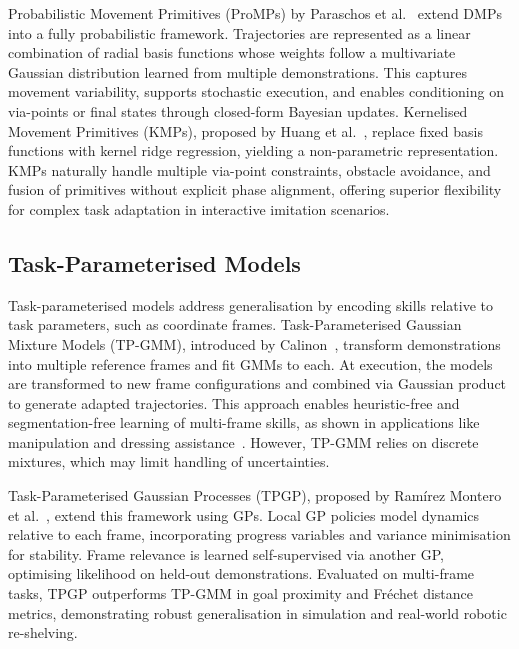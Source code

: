 \documentclass[a4paper, 10pt, conference]{ieeeconf}
\begin{document}
Probabilistic Movement Primitives (ProMPs) by Paraschos et al.~\cite{10.5555/2999792.2999904} extend DMPs into a fully probabilistic framework.
Trajectories are represented as a linear combination of radial basis functions whose weights follow a multivariate Gaussian distribution learned from multiple demonstrations.
This captures movement variability, supports stochastic execution, and enables conditioning on via-points or final states through closed-form Bayesian updates.
Kernelised Movement Primitives (KMPs), proposed by Huang et al.~\cite{Huang2019}, replace fixed basis functions with kernel ridge regression, yielding a non-parametric representation.
KMPs naturally handle multiple via-point constraints, obstacle avoidance, and fusion of primitives without explicit phase alignment, offering superior flexibility for complex task adaptation in interactive imitation scenarios.

\subsection{Task-Parameterised Models}

Task-parameterised models address generalisation by encoding skills relative to task parameters, such as coordinate frames.
Task-Parameterised Gaussian Mixture Models (TP-GMM), introduced by Calinon~\cite{calinon2016tutorial}, transform demonstrations into multiple reference frames and fit GMMs to each.
At execution, the models are transformed to new frame configurations and combined via Gaussian product to generate adapted trajectories.
This approach enables heuristic-free and segmentation-free learning of multi-frame skills, as shown in applications like manipulation and dressing assistance~\cite{pignat2017learning}.
However, TP-GMM relies on discrete mixtures, which may limit handling of uncertainties.

Task-Parameterised Gaussian Processes (TPGP), proposed by Ramírez Montero et al.~\cite{ramirez2024learning}, extend this framework using GPs.
Local GP policies model dynamics relative to each frame, incorporating progress variables and variance minimisation for stability.
Frame relevance is learned self-supervised via another GP, optimising likelihood on held-out demonstrations.
Evaluated on multi-frame tasks, TPGP outperforms TP-GMM in goal proximity and Fréchet distance metrics, demonstrating robust generalisation in simulation and real-world robotic re-shelving.
\end{document}
